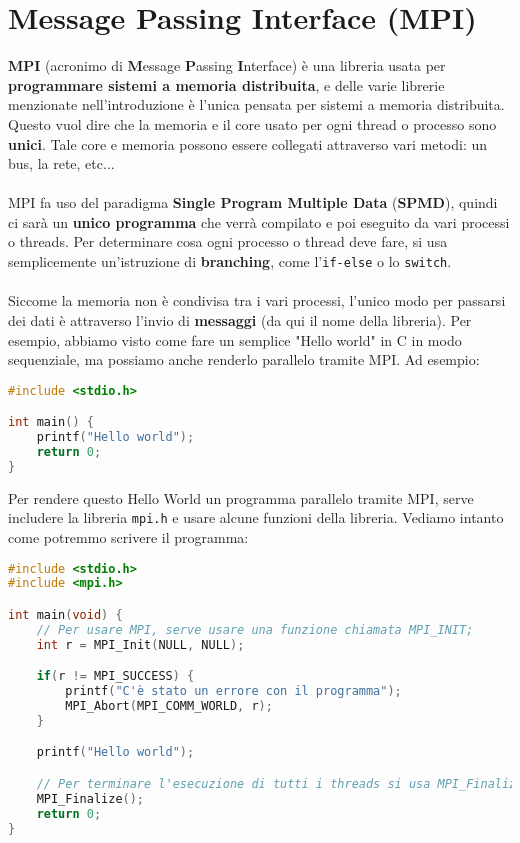 \chapter{Message Passing Interface (MPI)}

\textbf{MPI} (acronimo di \textbf{M}essage \textbf{P}assing \textbf{I}nterface) è una libreria usata per \textbf{programmare sistemi a memoria distribuita}, e delle varie librerie menzionate nell'introduzione è l'unica pensata per sistemi a memoria distribuita. Questo vuol dire che la memoria e il core usato per ogni thread o processo sono \textbf{unici}. Tale core e memoria possono essere collegati attraverso vari metodi: un bus, la rete, etc...
\\\\
MPI fa uso del paradigma \textbf{Single Program Multiple Data} (\textbf{SPMD}), quindi ci sarà un \textbf{unico programma} che verrà compilato e poi eseguito da vari processi o threads. Per determinare cosa ogni processo o thread deve fare, si usa semplicemente un'istruzione di \textbf{branching}, come l'\texttt{if-else} o lo \texttt{switch}.
\\\\
Siccome la memoria non è condivisa tra i vari processi, l'unico modo per passarsi dei dati è attraverso l'invio di \textbf{messaggi} (da qui il nome della libreria). Per esempio, abbiamo visto come fare un semplice "Hello world" in C in modo sequenziale, ma possiamo anche renderlo parallelo tramite MPI. Ad esempio:
\\
\begin{codeblock}
    \begin{lstlisting}[language = C, numbers = none, columns=fullflexible]
#include <stdio.h>

int main() {
    printf("Hello world");
    return 0;
}\end{lstlisting}
\end{codeblock}

Per rendere questo Hello World un programma parallelo tramite MPI, serve includere la libreria \texttt{mpi.h} e usare alcune funzioni della libreria. Vediamo intanto come potremmo scrivere il programma:
\\
\begin{codeblock}
    \begin{lstlisting}[language = C, numbers = none, columns=fullflexible]
#include <stdio.h>
#include <mpi.h>

int main(void) {
    // Per usare MPI, serve usare una funzione chiamata MPI_INIT;
    int r = MPI_Init(NULL, NULL);

    if(r != MPI_SUCCESS) {
        printf("C'è stato un errore con il programma");
        MPI_Abort(MPI_COMM_WORLD, r);
    }

    printf("Hello world");

    // Per terminare l'esecuzione di tutti i threads si usa MPI_Finalize
    MPI_Finalize();
    return 0;
}\end{lstlisting}
\end{codeblock}


